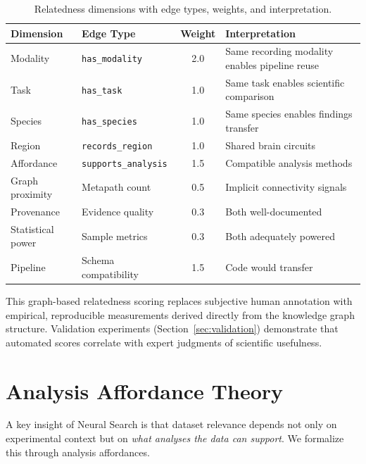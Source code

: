 \documentclass{article}
\theoremstyle{definition}
\begin{document}
\begin{table}[t]
\centering
\small
\caption{Relatedness dimensions with edge types, weights, and interpretation.}
\label{tab:relatedness-dims}
\begin{tabular}{llcp{4.5cm}}
\toprule
\textbf{Dimension} & \textbf{Edge Type} & \textbf{Weight} & \textbf{Interpretation} \\
\midrule
Modality & \texttt{has\_modality} & 2.0 & Same recording modality enables pipeline reuse \\
Task & \texttt{has\_task} & 1.0 & Same task enables scientific comparison \\
Species & \texttt{has\_species} & 1.0 & Same species enables findings transfer \\
Region & \texttt{records\_region} & 1.0 & Shared brain circuits \\
Affordance & \texttt{supports\_analysis} & 1.5 & Compatible analysis methods \\
Graph proximity & Metapath count & 0.5 & Implicit connectivity signals \\
Provenance & Evidence quality & 0.3 & Both well-documented \\
Statistical power & Sample metrics & 0.3 & Both adequately powered \\
Pipeline & Schema compatibility & 1.5 & Code would transfer \\
\bottomrule
\end{tabular}
\end{table}

This graph-based relatedness scoring replaces subjective human annotation with empirical, reproducible measurements derived directly from the knowledge graph structure. Validation experiments (Section~\ref{sec:validation}) demonstrate that automated scores correlate with expert judgments of scientific usefulness.

\section{Analysis Affordance Theory}
\label{sec:affordances}

A key insight of Neural Search is that dataset relevance depends not only on experimental context but on \textit{what analyses the data can support}. We formalize this through analysis affordances.
\end{document}
